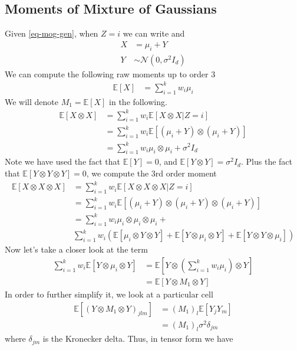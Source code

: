 \documentclass{article}
\begin{document}
\subsection{Moments of Mixture of Gaussians}
Given \eqref{eq-mog-gen}, when $Z=i$ we can write and
\begin{align}
X&=\mu_i + Y \\
\nonumber
Y&\sim \mathcal{N}(0,\sigma^2 I_{d})
\end{align}
We can compute the following raw moments up to order $3$
\begin{align}
\mathbb{E}[X]&=\sum_{i=1}^k w_i \mu_i
\end{align}
We will denote $M_1 = \mathbb{E}[X]$ in the following.
\begin{align}
\mathbb{E}[X\otimes X]&=\sum_{i=1}^k w_i \mathbb{E}[X\otimes X|Z=i]\\
&= \sum_{i=1}^k w_i \mathbb{E}[(\mu_i + Y)\otimes (\mu_i + Y)]\\
&=\sum_{i=1}^k w_i \mu_i\otimes \mu_i +  \sigma^2 I_d
\end{align}
Note we have used the fact that $\mathbb{E}[Y]=0$, and $\mathbb{E}[Y\otimes Y]=\sigma^2 I_d$. Plus the fact that $\mathbb{E}[Y\otimes Y\otimes Y]=0$, we compute the $3$rd order moment
\begin{align}
\mathbb{E}[X\otimes X \otimes X]&=\sum_{i=1}^k w_i \mathbb{E}[X\otimes X\otimes X|Z=i]\\
&= \sum_{i=1}^k w_i \mathbb{E}[(\mu_i + Y)\otimes (\mu_i + Y)\otimes (\mu_i + Y)]\\
&=\sum_{i=1}^k w_i \mu_i\otimes \mu_i\otimes \mu_i + \\
\nonumber
& \sum_{i=1}^k w_i\left( \mathbb{E}[\mu_i\otimes Y\otimes Y] + \mathbb{E}[ Y\otimes\mu_i\otimes Y] + \mathbb{E}[Y\otimes Y\otimes\mu_i]\right) 
\end{align}
Now let's take a closer look at the term
\begin{align*}
\sum_{i=1}^k w_i  \mathbb{E}[ Y\otimes\mu_i\otimes Y] &= \mathbb{E}[ Y\otimes(\sum_{i=1}^k w_i\mu_i)\otimes Y]\\
&= \mathbb{E}[ Y\otimes M_1\otimes Y]
\end{align*}
In order to further simplify it, we look at a particular cell
\begin{align*}
\mathbb{E}[ (Y\otimes M_1\otimes Y)_{jlm}] &= (M_1)_l \mathbb{E}[ Y_j Y_m]\\
&= (M_1)_l \sigma^2 \delta_{jm}
\end{align*}
where $\delta_{jm}$ is the Kronecker delta. Thus, in tensor form we have
\end{document}

